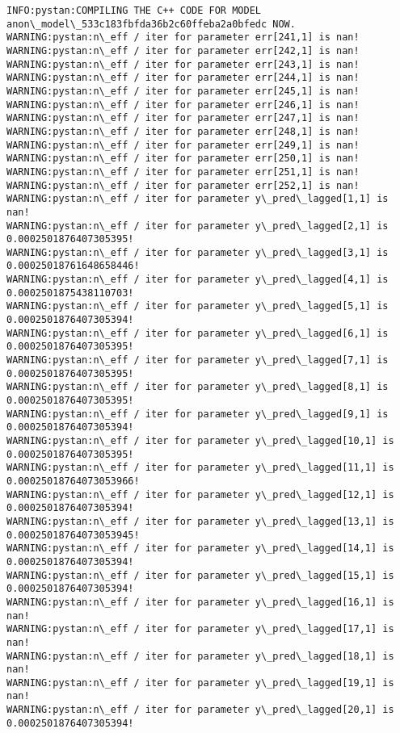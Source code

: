 \documentclass[11pt]{article}
\begin{document}
    \begin{Verbatim}[commandchars=\\\{\}]
INFO:pystan:COMPILING THE C++ CODE FOR MODEL anon\_model\_533c183fbfda36b2c60ffeba2a0bfedc NOW.
WARNING:pystan:n\_eff / iter for parameter err[241,1] is nan!
WARNING:pystan:n\_eff / iter for parameter err[242,1] is nan!
WARNING:pystan:n\_eff / iter for parameter err[243,1] is nan!
WARNING:pystan:n\_eff / iter for parameter err[244,1] is nan!
WARNING:pystan:n\_eff / iter for parameter err[245,1] is nan!
WARNING:pystan:n\_eff / iter for parameter err[246,1] is nan!
WARNING:pystan:n\_eff / iter for parameter err[247,1] is nan!
WARNING:pystan:n\_eff / iter for parameter err[248,1] is nan!
WARNING:pystan:n\_eff / iter for parameter err[249,1] is nan!
WARNING:pystan:n\_eff / iter for parameter err[250,1] is nan!
WARNING:pystan:n\_eff / iter for parameter err[251,1] is nan!
WARNING:pystan:n\_eff / iter for parameter err[252,1] is nan!
WARNING:pystan:n\_eff / iter for parameter y\_pred\_lagged[1,1] is nan!
WARNING:pystan:n\_eff / iter for parameter y\_pred\_lagged[2,1] is 0.0002501876407305395!
WARNING:pystan:n\_eff / iter for parameter y\_pred\_lagged[3,1] is 0.00025018761648658446!
WARNING:pystan:n\_eff / iter for parameter y\_pred\_lagged[4,1] is 0.0002501875438110703!
WARNING:pystan:n\_eff / iter for parameter y\_pred\_lagged[5,1] is 0.0002501876407305394!
WARNING:pystan:n\_eff / iter for parameter y\_pred\_lagged[6,1] is 0.0002501876407305395!
WARNING:pystan:n\_eff / iter for parameter y\_pred\_lagged[7,1] is 0.0002501876407305395!
WARNING:pystan:n\_eff / iter for parameter y\_pred\_lagged[8,1] is 0.0002501876407305395!
WARNING:pystan:n\_eff / iter for parameter y\_pred\_lagged[9,1] is 0.0002501876407305394!
WARNING:pystan:n\_eff / iter for parameter y\_pred\_lagged[10,1] is 0.0002501876407305395!
WARNING:pystan:n\_eff / iter for parameter y\_pred\_lagged[11,1] is 0.00025018764073053966!
WARNING:pystan:n\_eff / iter for parameter y\_pred\_lagged[12,1] is 0.0002501876407305394!
WARNING:pystan:n\_eff / iter for parameter y\_pred\_lagged[13,1] is 0.00025018764073053945!
WARNING:pystan:n\_eff / iter for parameter y\_pred\_lagged[14,1] is 0.0002501876407305394!
WARNING:pystan:n\_eff / iter for parameter y\_pred\_lagged[15,1] is 0.0002501876407305394!
WARNING:pystan:n\_eff / iter for parameter y\_pred\_lagged[16,1] is nan!
WARNING:pystan:n\_eff / iter for parameter y\_pred\_lagged[17,1] is nan!
WARNING:pystan:n\_eff / iter for parameter y\_pred\_lagged[18,1] is nan!
WARNING:pystan:n\_eff / iter for parameter y\_pred\_lagged[19,1] is nan!
WARNING:pystan:n\_eff / iter for parameter y\_pred\_lagged[20,1] is 0.0002501876407305394!

\end{Verbatim}
\end{document}
